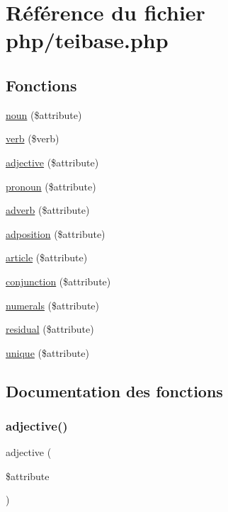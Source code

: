 \hypertarget{teibase_8php}{}\section{Référence du fichier php/teibase.php}
\label{teibase_8php}
\subsection*{Fonctions}
\begin{DoxyCompactItemize}
\item 
\hyperlink{teibase_8php_abf7279ef010ee6cdbdfa526cab639f1e}{noun} (\$attribute)
\item 
\hyperlink{teibase_8php_aa8d8fadfcf4239c7aa288414da9d0ace}{verb} (\$verb)
\item 
\hyperlink{teibase_8php_a482e749fc174678c4b467a9ba464b7a1}{adjective} (\$attribute)
\item 
\hyperlink{teibase_8php_add011867e93c34958347b43a8f01f50d}{pronoun} (\$attribute)
\item 
\hyperlink{teibase_8php_aab932d0abbd74bb3e95b0ca5d75dfeea}{adverb} (\$attribute)
\item 
\hyperlink{teibase_8php_ad24e98855f72a067dc60658ec8db3435}{adposition} (\$attribute)
\item 
\hyperlink{teibase_8php_a1300a7b74f1fcda334a3c291cf92167e}{article} (\$attribute)
\item 
\hyperlink{teibase_8php_a7e9a92d63a2b96fa0e06c8636014c558}{conjunction} (\$attribute)
\item 
\hyperlink{teibase_8php_adf6beb3905b7622ba5fd8efc65fa1a76}{numerals} (\$attribute)
\item 
\hyperlink{teibase_8php_a51d19eeebd0f05bca89e3a5708b6d17d}{residual} (\$attribute)
\item 
\hyperlink{teibase_8php_aecd6c7fc20579d6689085fb260d8eca1}{unique} (\$attribute)
\end{DoxyCompactItemize}


\subsection{Documentation des fonctions}
\hypertarget{teibase_8php_a482e749fc174678c4b467a9ba464b7a1}{}\label{teibase_8php_a482e749fc174678c4b467a9ba464b7a1} 
\subsubsection{\texorpdfstring{adjective()}{adjective()}}
{\footnotesize\ttfamily adjective (\begin{DoxyParamCaption}\item[{}]{\$attribute }\end{DoxyParamCaption})}

